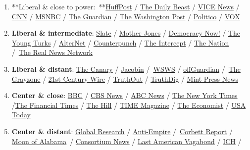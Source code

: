 \begin{enumerate}
\def\labelenumi{\arabic{enumi}.}
\tightlist
\item
  **Liberal \& close to
  power:~**\href{https://www.huffpost.com/}{HuffPost} /
  \href{https://www.thedailybeast.com/}{The Daily Beast} /
  \href{https://www.vice.com/}{VICE News} /
  \href{https://www.cnn.com/}{CNN} /
  \href{https://www.msnbc.com/}{MSNBC} /
  \href{https://www.theguardian.com/}{The Guardian} /
  \href{https://www.washingtonpost.com/}{The Washington Post} /
  \href{https://www.politico.com/}{Politico} /
  \href{https://www.vox.com/}{VOX}
\item
  \textbf{Liberal \& intermediate}: \href{https://slate.com/}{Slate} /
  \href{https://www.motherjones.com/}{Mother Jones} /
  \href{https://www.democracynow.org/}{Democracy Now!} /
  \href{https://tyt.com/}{The Young Turks} /
  \href{https://www.alternet.org/}{AlterNet} /
  \href{https://www.counterpunch.org/}{Counterpunch} /
  \href{https://theintercept.com/}{The Intercept} /
  \href{https://www.thenation.com/}{The Nation}
  /~\href{https://therealnews.com/}{The Real News Network}
\item
  \textbf{Liberal \& distant}: \href{https://www.thecanary.co/}{The
  Canary} / \href{https://jacobinmag.com/}{Jacobin}
  /~\href{https://www.wsws.org/}{WSWS} /
  \href{https://off-guardian.org/}{offGuardian}
  /~\href{https://thegrayzone.com/}{The Grayzone} /
  \href{https://21stcenturywire.com/}{21st Century Wire} /
  \href{https://truthout.org/}{TruthOut} /
  \href{https://www.truthdig.com/}{TruthDig} /
  \href{https://www.mintpressnews.com/}{Mint Press News}
\item
  \textbf{Center \& close}: \href{https://www.bbc.co.uk/}{BBC} /
  \href{https://www.cbsnews.com/}{CBS News} /
  \href{https://abcnews.go.com/}{ABC News} /
  \href{https://www.nytimes.com/}{The New York Times}
  /\href{https://www.ft.com/}{The Financial Times} /
  \href{https://thehill.com/}{The Hill} / \href{https://time.com/}{TIME
  Magazine} / \href{https://www.economist.com/}{The Economist} /
  \href{https://www.usatoday.com/}{USA Today}
\item
  \textbf{Center \& distant}:
  \href{https://www.globalresearch.ca/}{Global Research} /
  \href{https://www.anti-empire.com/}{Anti-Empire}
  /~\href{https://www.corbettreport.com/}{Corbett Report} /
  \href{https://www.moonofalabama.org/}{Moon of Alabama}~/
  \href{https://consortiumnews.com/}{Consortium News} /
  \href{https://www.thelastamericanvagabond.com/}{Last American
  Vagabond} / \href{http://www.informationclearinghouse.info/}{ICH} /

\end{enumerate}
